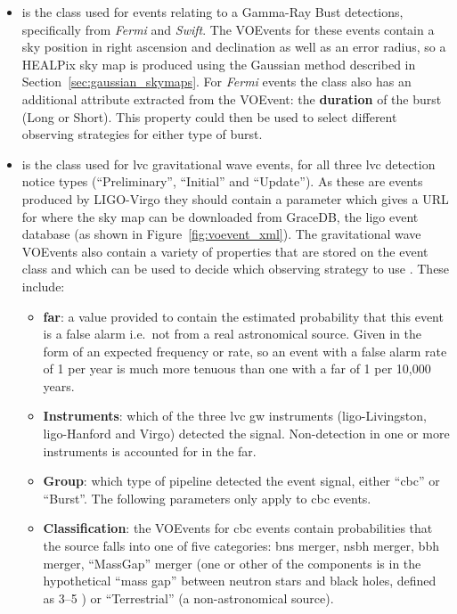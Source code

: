 \begin{colsection}
\begin{colsection}
\begin{itemize}
    \item {} is the class used for events relating to a Gamma-Ray Bust detections, specifically from \textit{Fermi} and \textit{Swift}. The VOEvents for these events contain a sky position in right ascension and declination as well as an error radius, so a HEALPix sky map is produced using the Gaussian method described in Section~\ref{sec:gaussian_skymaps}. For \textit{Fermi} events the class also has an additional attribute extracted from the VOEvent: the \textbf{duration} of the burst (Long or Short). This property could then be used to select different observing strategies for either type of burst.

    \item {} is the class used for \gls{lvc} gravitational wave events, for all three \gls{lvc} detection notice types (``Preliminary'', ``Initial'' and ``Update''). As these are events produced by LIGO-Virgo they should contain a  parameter which gives a URL for where the sky map can be downloaded from GraceDB, the \gls{ligo} event database (as shown in Figure~\ref{fig:voevent_xml}). The gravitational wave VOEvents also contain a variety of properties that are stored on the event class and which can be used to decide which observing strategy to use \citep{LVC_userguide}. These include:
    \begin{itemize}
        \item \textbf{\gls{far}}: a value provided to contain the estimated probability that this event is a false alarm i.e.\ not from a real astronomical source. Given in the form of an expected frequency or rate, so an event with a false alarm rate of 1 per year is much more tenuous than one with a \gls{far} of 1 per 10,000 years.
        \item \textbf{Instruments}: which of the three \gls{lvc} \gls{gw} instruments (\gls{ligo}-Livingston, \gls{ligo}-Hanford and Virgo) detected the signal. Non-detection in one or more instruments is accounted for in the \gls{far}.
        \item \textbf{Group}: which type of pipeline detected the event signal, either ``\gls{cbc}'' or ``Burst''. The following parameters only apply to \gls{cbc} events.
        \item \textbf{Classification}: the VOEvents for \gls{cbc} events contain probabilities that the source falls into one of five categories: \gls{bns} merger, \gls{nsbh} merger, \gls{bbh} merger, ``MassGap'' merger (one or other of the components is in the hypothetical ``mass gap'' between neutron stars and black holes, defined as 3--\SI{5}{\solarmass} \citep{GW_MassGap}) or ``Terrestrial'' (a non-astronomical source).

\end{itemize}
\end{itemize}
\end{colsection}
\end{colsection}
